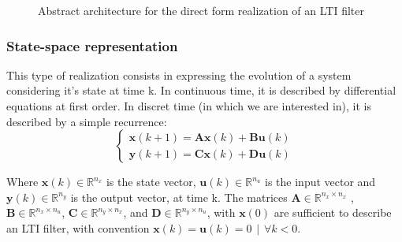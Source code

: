 \begin{figure*}

\caption{Abstract architecture for the direct form realization of an LTI filter \label{fig:ltiarch}}
\end{figure*}

	\subsubsection{State-space representation}
	This type of realization consists in expressing the evolution of a system considering it’s state at time k. In
	continuous time, it is described by differential equations at first order. In discret time (in which we
	are interested in), it is described by a simple recurrence:
	\begin{equation} \label{abcddef}
		\begin{cases}
			\boldsymbol{x}(k+1)= \boldsymbol{Ax}(k) + \boldsymbol{Bu}(k) \\
			\boldsymbol{y}(k+1)= \boldsymbol{Cx}(k) + \boldsymbol{Du}(k)
		\end{cases}
	\end{equation}

	Where $\boldsymbol{x}(k) \in \mathbb{R}^{n_x}$ is the state vector,
	$\boldsymbol{u}(k) \in \mathbb{R}^{n_u}$ is the input vector and
	$\boldsymbol{y}(k) \in \mathbb{R}^{n_y}$ is the output vector, at time k.
	The matrices $\boldsymbol{A} \in \mathbb{R}^{n_x \times n_x}$ , $\boldsymbol{B} \in \mathbb{R}^{n_x \times n_u}$,
	$\boldsymbol{C} \in \mathbb{R}^{n_y \times n_x}$, and $\boldsymbol{D} \in \mathbb{R}^{n_y \times n_u}$,
	with $\boldsymbol{x}(0)$ are sufficient to describe an LTI filter, with convention $\boldsymbol{x}(k)=\boldsymbol{u}(k)=0 \hspace{5pt} | \hspace{5pt} \forall k<0$.

